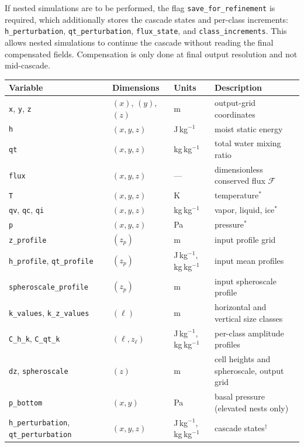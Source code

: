 \documentclass{article}
\begin{document}
If nested simulations are to be performed, the flag \texttt{save\_for\_refinement} is required, which additionally stores the cascade states and per-class increments: \texttt{h\_perturbation}, \texttt{qt\_perturbation}, \texttt{flux\_state}, and \texttt{class\_increments}. This allows nested simulations to continue the cascade without reading the final compensated fields. Compensation is only done at final output resolution and not mid-cascade.

\begin{table}
\centering
\footnotesize
\setlength{\tabcolsep}{4pt}
\begin{tabular}{llll}
\hline
Variable & Dimensions & Units & Description \\
\hline
\texttt{x}, \texttt{y}, \texttt{z} & $(x)$, $(y)$, $(z)$ & m & output-grid coordinates \\
\hline
\texttt{h} & $(x,y,z)$ & J\,kg$^{-1}$ & moist static energy \\
\texttt{qt} & $(x,y,z)$ & kg\,kg$^{-1}$ & total water mixing ratio \\
\texttt{flux} & $(x,y,z)$ & --- & dimensionless conserved flux $\mathcal{F}$ \\
\hline
\texttt{T} & $(x,y,z)$ & K & temperature$^{\ast}$ \\
\texttt{qv}, \texttt{qc}, \texttt{qi} & $(x,y,z)$ & kg\,kg$^{-1}$ & vapor, liquid, ice$^{\ast}$ \\
\texttt{p} & $(x,y,z)$ & Pa & pressure$^{\ast}$ \\
\hline
\texttt{z\_profile} & $(z_p)$ & m & input profile grid \\
\texttt{h\_profile}, \texttt{qt\_profile} & $(z_p)$ & J\,kg$^{-1}$, kg\,kg$^{-1}$ & input mean profiles \\
\texttt{spheroscale\_profile} & $(z_p)$ & m & input spheroscale profile \\
\hline
\texttt{k\_values}, \texttt{k\_z\_values} & $(\ell)$ & m & horizontal and vertical size classes \\
\texttt{C\_h\_k}, \texttt{C\_qt\_k} & $(\ell, z_\ell)$ & J\,kg$^{-1}$, kg\,kg$^{-1}$ & per-class amplitude profiles \\
\texttt{dz}, \texttt{spheroscale} & $(z)$ & m & cell heights and spheroscale, output grid \\
\hline
\texttt{p\_bottom} & $(x,y)$ & Pa & basal pressure (elevated nests only) \\
\hline
\texttt{h\_perturbation}, \texttt{qt\_perturbation} & $(x,y,z)$ & J\,kg$^{-1}$, kg\,kg$^{-1}$ & cascade states$^{\dagger}$ \\

\end{tabular}
\end{table}
\end{document}
